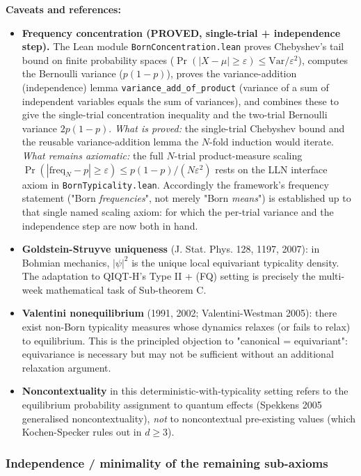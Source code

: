 \documentclass[11pt,a4paper]{article}
\begin{document}
\textbf{Caveats and references:}
\begin{itemize}
  \item \textbf{Frequency concentration (PROVED, single-trial + independence step).} The Lean module \texttt{BornConcentration.lean} proves Chebyshev's tail bound on finite probability spaces ($\Pr(|X-\mu| \ge \varepsilon) \le \mathrm{Var}/\varepsilon^2$), computes the Bernoulli variance ($p(1-p)$), proves the variance-addition (independence) lemma \texttt{variance\_add\_of\_product} (variance of a sum of independent variables equals the sum of variances), and combines these to give the single-trial concentration inequality and the two-trial Bernoulli variance $2p(1-p)$. \emph{What is proved:} the single-trial Chebyshev bound and the reusable variance-addition lemma the $N$-fold induction would iterate. \emph{What remains axiomatic:} the full $N$-trial product-measure scaling $\Pr(|\mathrm{freq}_N - p| \ge \varepsilon) \le p(1-p)/(N\varepsilon^2)$ rests on the LLN interface axiom in \texttt{BornTypicality.lean}. Accordingly the framework's frequency statement ("Born \emph{frequencies}", not merely "Born \emph{means}") is established up to that single named scaling axiom: for which the per-trial variance and the independence step are now both in hand.
  \item \textbf{Goldstein-Struyve uniqueness} (J. Stat. Phys. 128, 1197, 2007): in Bohmian mechanics, $|\psi|^2$ is the unique local equivariant typicality density. The adaptation to QIQT-H's Type II + (FQ) setting is precisely the multi-week mathematical task of Sub-theorem C.
  \item \textbf{Valentini nonequilibrium} (1991, 2002; Valentini-Westman 2005): there exist non-Born typicality measures whose dynamics relaxes (or fails to relax) to equilibrium. This is the principled objection to "canonical = equivariant": equivariance is necessary but may not be sufficient without an additional relaxation argument.
  \item \textbf{Noncontextuality} in this deterministic-with-typicality setting refers to the equilibrium probability assignment to quantum effects (Spekkens 2005 generalised noncontextuality), \emph{not} to noncontextual pre-existing values (which Kochen-Specker rules out in $d \ge 3$).
\end{itemize}

\subsubsection{Independence / minimality of the remaining sub-axioms}
\end{document}
